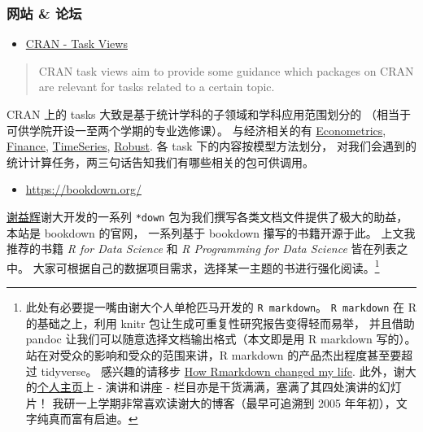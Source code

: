 \documentclass[11pt,hyperref]{ctexart}
\providecommand{\tightlist}{%
  \setlength{\itemsep}{0pt}\setlength{\parskip}{0pt}}
\begin{document}
\hypertarget{ux7f51ux7ad9-ux8bbaux575b}{%
\subsubsection{网站 \& 论坛}\label{ux7f51ux7ad9-ux8bbaux575b}}

\begin{itemize}
\tightlist
\item
  \href{https://mirrors.tuna.tsinghua.edu.cn/CRAN/web/views/}{CRAN -
  Task Views}
\end{itemize}

\begin{quote}
CRAN task views aim to provide some guidance which packages on CRAN are
relevant for tasks related to a certain topic.
\end{quote}

CRAN 上的 tasks 大致是基于统计学科的子领域和学科应用范围划分的
（相当于可供学院开设一至两个学期的专业选修课）。 与经济相关的有
\href{https://mirrors.tuna.tsinghua.edu.cn/CRAN/web/views/Econometrics.html}{Econometrics},
\href{https://mirrors.tuna.tsinghua.edu.cn/CRAN/web/views/Finance.html}{Finance},
\href{https://mirrors.tuna.tsinghua.edu.cn/CRAN/web/views/TimeSeries.html}{TimeSeries},
\href{https://mirrors.tuna.tsinghua.edu.cn/CRAN/web/views/Robust.html}{Robust}.
各 task 下的内容按模型方法划分，
对我们会遇到的统计计算任务，两三句话告知我们有哪些相关的包可供调用。

\begin{itemize}
\tightlist
\item
  \url{https://bookdown.org/}
\end{itemize}

\href{https://yihui.org/}{谢益辉}谢大开发的一系列 \texttt{*down}
包为我们撰写各类文档文件提供了极大的助益，本站是 bookdown 的官网，
一系列基于 bookdown 攥写的书籍开源于此。 上文我推荐的书籍 \emph{R for
Data Science} 和 \emph{R Programming for Data Science} 皆在列表之中。
大家可根据自己的数据项目需求，选择某一主题的书进行强化阅读。\footnote{此处有必要提一嘴由谢大个人单枪匹马开发的
  \texttt{R\ markdown}。 \texttt{R\ markdown} 在 R 的基础之上，利用
  knitr 包让生成可重复性研究报告变得轻而易举， 并且借助 pandoc
  让我们可以随意选择文档输出格式（本文即是用 R markdown 写的）。
  站在对受众的影响和受众的范围来讲，R markdown 的产品杰出程度甚至要超过
  tidyverse。 感兴趣的请移步
  \href{https://robjhyndman.com/seminars/rmarkdown/}{How Rmarkdown
  changed my life}. 此外，谢大的\href{https://yihui.org/}{个人主页}上 -
  演讲和讲座 - 栏目亦是干货满满，塞满了其四处演讲的幻灯片！
  我研一上学期非常喜欢读谢大的博客（最早可追溯到 2005
  年年初），文字纯真而富有启迪。}
\end{document}
